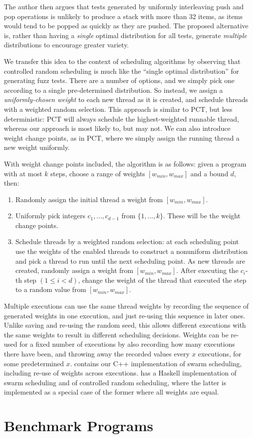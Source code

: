 The author then argues that tests generated by uniformly interleaving push and
pop operations is unlikely to produce a stack with more than 32 items, as items
would tend to be popped as quickly as they are pushed.  The proposed alternative
is, rather than having a \emph{single} optimal distribution for all tests,
generate \emph{multiple} distributions to encourage greater variety.

We transfer this idea to the context of scheduling algorithms by observing that
controlled random scheduling is much like the ``single optimal distribution''
for generating fuzz tests.  There are a number of options, and we simply pick
one according to a single pre-determined distribution.  So instead, we assign
a \emph{uniformly-chosen weight} to each new thread as it is created, and
schedule threads with a weighted random selection.  This approach is similar to
PCT, but less deterministic: PCT will always schedule the highest-weighted
runnable thread, whereas our approach is most likely to, but may not.  We can
also introduce weight change points, as in PCT, where we simply assign the
running thread a new weight uniformly.

With weight change points included, the algorithm is as follows: given a program
with at most $k$ steps, choose a range of weights $[w_{min}, w_{max}]$ and
a bound $d$, then:

\begin{enumerate}
\item Randomly assign the initial thread a weight from $[w_{min}, w_{max}]$.
\item Uniformly pick integers $c_1, \ldots, c_{d-1}$ from $\{1, \ldots, k\}$.
These will be the weight change points.
\item Schedule threads by a weighted random selection: at each scheduling point
use the weights of the enabled threads to construct a nonuniform distribution
and pick a thread to run until the next scheduling point.  As new threads are
created, randomly assign a weight from $[w_{min}, w_{max}]$.  After executing
the $c_i$-th step $(1 \leq i < d)$, change the weight of the thread that
executed the step to a random value from $[w_{min}, w_{max}]$.
\end{enumerate}

Multiple executions can use the same thread weights by recording the sequence of
generated weights in one execution, and just re-using this sequence in later
ones.  Unlike saving and re-using the random seed, this allows different
executions with the same weights to result in different scheduling decisions.
Weights can be re-used for a fixed number of executions by also recording how
many executions there have been, and throwing away the recorded values every $x$
executions, for some predetermined $x$.   contains our C++
implementation of swarm scheduling, including re-use of weights across
executions.  \dejafu{} has a Haskell implementation of swarm scheduling and of
controlled random scheduling, where the latter is implemented as a special case
of the former where all weights are equal.

\section{Benchmark Programs}
\label{sec:algorithms-sctbench}

\blindtext
